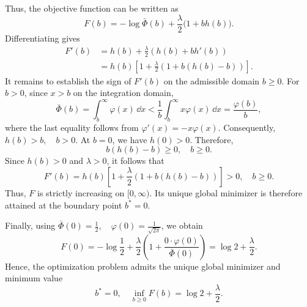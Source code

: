 \documentclass[12pt,a4paper,oneside]{book}
\begin{document}
\begin{example}
\begin{solution}
Thus, the objective function can be written as
\begin{equation*}
    F(b) = -\log\bar\Phi(b) + \frac{\lambda}{2}\bigl(1+bh(b)\bigr).
\end{equation*}
Differentiating gives
\begin{equation*}
\begin{aligned}
    F'(b) &= h(b)+\frac{\lambda}{2} \left(h(b)+bh'(b)\right)\\
    &= h(b)
    \left[
        1+\frac{\lambda}{2}\left(1+b(h(b)-b)\right)
    \right].
\end{aligned}
\end{equation*}
It remains to establish the sign of $F'(b)$ on the admissible domain $b\geq0$. For $b>0$, since $x>b$ on the integration
domain,
\begin{equation*}
    \bar\Phi(b) = \int_b^\infty\varphi(x)\,\dd x < \frac{1}{b} \int_b^\infty x\varphi(x)\,\dd x = \frac{\varphi(b)}{b},
\end{equation*}
where the last equality follows from $\varphi'(x)=-x\varphi(x)$. Consequently, $h(b)>b,\quad b>0$. At $b=0$, we have $h(0)>0$.
Therefore,
\begin{equation*}
    b(h(b)-b)\geq0, \quad b\geq0.
\end{equation*}
Since $h(b)>0$ and $\lambda>0$, it follows that
\begin{equation*}
    F'(b) = h(b)
        \left[
            1+\frac{\lambda}{2} \left(1+b(h(b)-b)\right)
        \right]
    >0,
    \quad b\geq0.
\end{equation*}
Thus, $F$ is strictly increasing on $[0,\infty)$. Its unique global minimizer is therefore attained at the boundary point
$b^*=0$.

Finally, using $\bar\Phi(0)=\frac12, \quad \varphi(0)=\frac{1}{\sqrt{2\pi}}$, we obtain
\begin{equation*}
    F(0) = -\log\frac12 + \frac{\lambda}{2}
        \left(
            1+\frac{0\cdot\varphi(0)}{\bar\Phi(0)}
        \right)
    = \log 2+\frac{\lambda}{2}.
\end{equation*}
Hence, the optimization problem admits the unique global minimizer and minimum value
\begin{equation*}
    b^*=0, \quad \inf_{b\geq0}F(b) = \log 2+\frac{\lambda}{2}.
\end{equation*}
\end{solution}
\end{example}
\end{document}
